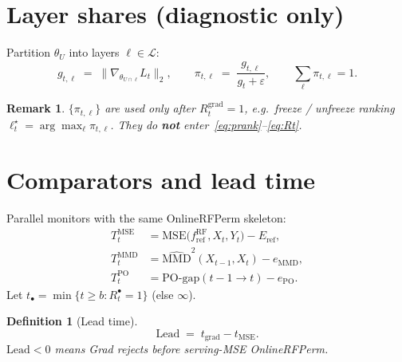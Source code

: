 \documentclass[11pt]{article}
\newtheorem{definition}{Definition}
\newtheorem{remark}{Remark}
\newcommand{\Lead}{\mathrm{Lead}}
\begin{document}
\section{Layer shares (diagnostic only)}
\label{sec:shares}

Partition $\theta_U$ into layers $\ell\in\mathcal{L}$:
\begin{equation}
\label{eq:gl}
  g_{t,\ell}
  \;=\;
  \bigl\| \nabla_{\theta_{U\cap\ell}} L_t \bigr\|_2,
  \qquad
  \pi_{t,\ell}
  \;=\;
  \frac{g_{t,\ell}}{g_t+\varepsilon},
  \qquad
  \sum_{\ell}\pi_{t,\ell}=1.
\end{equation}

\begin{remark}
$\{\pi_{t,\ell}\}$ are used \emph{only after} $R_t^{\mathrm{grad}}=1$,
e.g.\ freeze / unfreeze ranking
$\ell^\star_t=\arg\max_{\ell}\pi_{t,\ell}$.
They do \textbf{not} enter~\eqref{eq:prank}--\eqref{eq:Rt}.
\end{remark}

\section{Comparators and lead time}
\label{sec:lead}

Parallel monitors with the same OnlineRFPerm skeleton:
\begin{align}
  T_t^{\mathrm{MSE}}
  &=
  \mathrm{MSE}\bigl(f_{\mathrm{ref}}^{\mathrm{RF}},X_t,Y_t\bigr)
  - E_{\mathrm{ref}},
  \label{eq:mse}\\[0.25em]
  T_t^{\mathrm{MMD}}
  &=
  \widehat{\mathrm{MMD}}^2(X_{t-1},X_t)
  - e_{\mathrm{MMD}},
  \label{eq:mmd}\\[0.25em]
  T_t^{\mathrm{PO}}
  &=
  \mathrm{PO\text{-}gap}(t-1\!\to\! t)
  - e_{\mathrm{PO}}.
  \label{eq:po}
\end{align}
Let $t_{\bullet}=\min\{t\ge b: R_t^{\bullet}=1\}$ (else $\infty$).

\begin{definition}[Lead time]
\begin{equation}
\label{eq:lead}
  \Lead
  \;=\;
  t_{\mathrm{grad}} - t_{\mathrm{MSE}}.
\end{equation}
$\Lead<0$ means Grad rejects \emph{before} serving-MSE OnlineRFPerm.
\end{definition}

\end{document}
